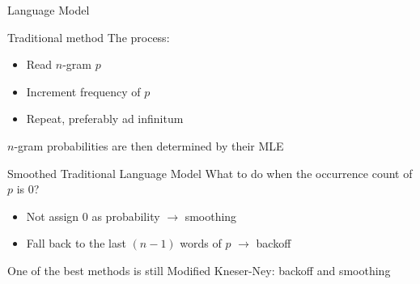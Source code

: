 \begin{frame}{Language Model}
    \begin{block}{Traditional method}
        The process:
        \begin{itemize}
            \item Read $n$-gram $p$
            \item Increment frequency of $p$
            \item Repeat, preferably ad infinitum
        \end{itemize}

        $n$-gram probabilities are then determined by their MLE
    \end{block}

    \begin{block}{Smoothed Traditional Language Model}
        What to do when the occurrence count of $p$ is 0?
        \begin{itemize}
            \item Not assign 0 as probability $\rightarrow$ smoothing
            \item Fall back to the last $(n-1)$ words of $p$ $\rightarrow$ backoff
        \end{itemize}

        One of the best methods is still Modified Kneser-Ney: backoff and smoothing
    \end{block}
\end{frame}
\note[itemize]{
}

